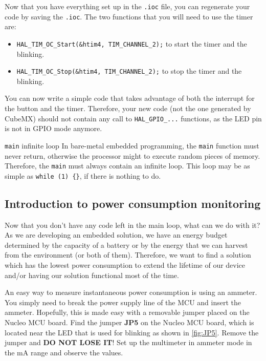 Now that you have everything set up in the \texttt{.ioc} file, you can regenerate your code by saving the \texttt{.ioc}. The two functions that you will need to use the timer are:
\begin{itemize}
    \item \texttt{HAL\_TIM\_OC\_Start(\&htim4, TIM\_CHANNEL\_2);} to start the timer and the blinking.
    \item \texttt{HAL\_TIM\_OC\_Stop(\&htim4, TIM\_CHANNEL\_2);} to stop the timer and the blinking.
\end{itemize}
You can now write a simple code that takes advantage of both the interrupt for the button and the timer. Therefore, your new code (not the one generated by CubeMX) should not contain any call to \texttt{HAL\_GPIO\_...} functions, as the LED pin is not in GPIO mode anymore.

\begin{bclogo}[couleur = gray!20, arrondi = 0.2, logo=\bcattention]{\texttt{main} infinite loop}
In bare-metal embedded programming, the \texttt{main} function must never return, otherwise the processor might to execute random pieces of memory. Therefore, the \texttt{main} must always contain an infinite loop. This loop may be as simple as \texttt{while (1) \{\}}, if there is nothing to do.
\end{bclogo}

\vspace{-0.3cm}
\subsection{Introduction to power consumption monitoring}
Now that you don't have any code left in the main loop, what can we do with it? As we are developing an embedded solution, we have an energy budget determined by the capacity of a battery or by the energy that we can harvest from the environment (or both of them). Therefore, we want to find a solution which has the lowest power consumption to extend the lifetime of our device and/or having our solution functional most of the time.

An easy way to measure instantaneous power consumption is using an ammeter. You simply need to break the power supply line of the MCU and insert the ammeter. Hopefully, this is made easy with a removable jumper placed on the Nucleo MCU board. Find the jumper \textbf{JP5} on the Nucleo MCU board, which is located near the LED that is used for blinking as shown in \autoref{fig:JP5}. Remove the jumper and \textbf{DO NOT LOSE IT}! Set up the multimeter in ammeter mode in the mA range and observe the values.

